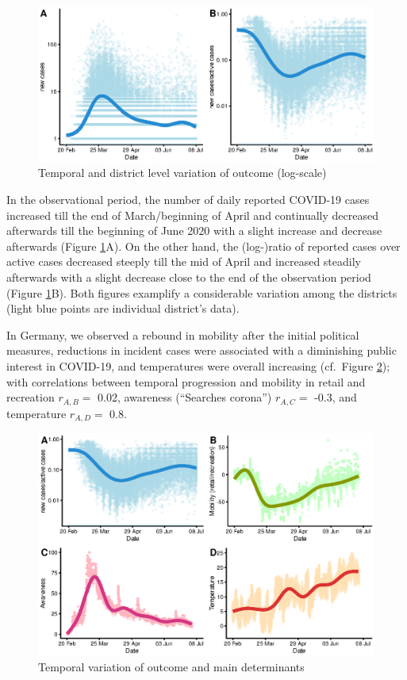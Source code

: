 \documentclass[]{elsarticle} %
\begin{document}
\begin{figure}
\centering
\includegraphics{figures/f_timeseries_cases_and_lograte.eps}
\caption{\label{fig:cases-log}Temporal and district level variation of outcome (log-scale)}
\end{figure}

In the observational period, the number of daily reported COVID-19 cases increased till the end of March/beginning of April and continually decreased afterwards till the beginning of June 2020 with a slight increase and decrease afterwards (Figure \ref{fig:cases-log}A). On the other hand, the (log-)ratio of reported cases over active cases decreased steeply till the mid of April and increased steadily afterwards with a slight decrease close to the end of the observation period (Figure \ref{fig:cases-log}B). Both figures examplify a considerable variation among the districts (light blue points are individual district's data).

In Germany, we observed a rebound in mobility after the initial political measures, reductions in incident cases were associated with a diminishing public interest in COVID-19, and temperatures were overall increasing (cf.~Figure \ref{fig:timeseries}); with correlations between temporal progression and mobility in retail and recreation \(r_{A,B}=\) 0.02, awareness (``Searches corona'') \(r_{A,C}=\) -0.3, and temperature \(r_{A,D}=\) 0.8.

\begin{figure}
\centering
\includegraphics{figures/f_timeseries_exposures.eps}
\caption{\label{fig:timeseries}Temporal variation of outcome and main determinants}
\end{figure}
\end{document}

